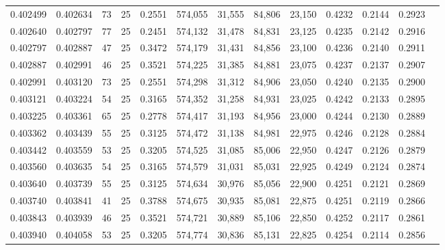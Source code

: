 \begin{tabular}{rrrrrrrrrrrrr}
0.402499 & 0.402634 &    73 &  25 &                                     0.2551 & 574,055 &  31,555 &  84,806 &  23,150 & 0.4232 & 0.2144 & 0.2923 \\
0.402640 & 0.402797 &    77 &  25 &                                     0.2451 & 574,132 &  31,478 &  84,831 &  23,125 & 0.4235 & 0.2142 & 0.2916 \\
0.402797 & 0.402887 &    47 &  25 &                                     0.3472 & 574,179 &  31,431 &  84,856 &  23,100 & 0.4236 & 0.2140 & 0.2911 \\
0.402887 & 0.402991 &    46 &  25 &                                     0.3521 & 574,225 &  31,385 &  84,881 &  23,075 & 0.4237 & 0.2137 & 0.2907 \\
0.402991 & 0.403120 &    73 &  25 &                                     0.2551 & 574,298 &  31,312 &  84,906 &  23,050 & 0.4240 & 0.2135 & 0.2900 \\
0.403121 & 0.403224 &    54 &  25 &                                     0.3165 & 574,352 &  31,258 &  84,931 &  23,025 & 0.4242 & 0.2133 & 0.2895 \\
0.403225 & 0.403361 &    65 &  25 &                                     0.2778 & 574,417 &  31,193 &  84,956 &  23,000 & 0.4244 & 0.2130 & 0.2889 \\
0.403362 & 0.403439 &    55 &  25 &                                     0.3125 & 574,472 &  31,138 &  84,981 &  22,975 & 0.4246 & 0.2128 & 0.2884 \\
0.403442 & 0.403559 &    53 &  25 &                                     0.3205 & 574,525 &  31,085 &  85,006 &  22,950 & 0.4247 & 0.2126 & 0.2879 \\
0.403560 & 0.403635 &    54 &  25 &                                     0.3165 & 574,579 &  31,031 &  85,031 &  22,925 & 0.4249 & 0.2124 & 0.2874 \\
0.403640 & 0.403739 &    55 &  25 &                                     0.3125 & 574,634 &  30,976 &  85,056 &  22,900 & 0.4251 & 0.2121 & 0.2869 \\
0.403740 & 0.403841 &    41 &  25 &                                     0.3788 & 574,675 &  30,935 &  85,081 &  22,875 & 0.4251 & 0.2119 & 0.2866 \\
0.403843 & 0.403939 &    46 &  25 &                                     0.3521 & 574,721 &  30,889 &  85,106 &  22,850 & 0.4252 & 0.2117 & 0.2861 \\
0.403940 & 0.404058 &    53 &  25 &                                     0.3205 & 574,774 &  30,836 &  85,131 &  22,825 & 0.4254 & 0.2114 & 0.2856 \\

\end{tabular}
